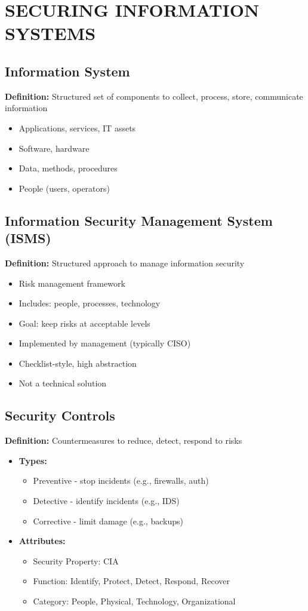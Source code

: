 \section{SECURING INFORMATION SYSTEMS}

\subsection{Information System}
{
\textbf{Definition:} Structured set of components to collect, process, store, communicate information
\begin{itemize}[noitemsep]
  \item Applications, services, IT assets
  \item Software, hardware
  \item Data, methods, procedures
  \item People (users, operators)
\end{itemize}
}
\subsection{Information Security Management System (ISMS)}
{
\textbf{Definition:} Structured approach to manage information security
\begin{itemize}[noitemsep]
  \item Risk management framework
  \item Includes: people, processes, technology
  \item Goal: keep risks at acceptable levels
  \item Implemented by management (typically CISO)
  \item Checklist-style, high abstraction
  \item Not a technical solution
\end{itemize}
}
\subsection{Security Controls}
{
\textbf{Definition:} Countermeasures to reduce, detect, respond to risks
\begin{itemize}[noitemsep]
  \item \textbf{Types:}
    \begin{itemize}[noitemsep]
      \item Preventive - stop incidents (e.g., firewalls, auth)
      \item Detective - identify incidents (e.g., IDS)
      \item Corrective - limit damage (e.g., backups)
    \end{itemize}
  \item \textbf{Attributes:}
    \begin{itemize}[noitemsep]
      \item Security Property: CIA
      \item Function: Identify, Protect, Detect, Respond, Recover
      \item Category: People, Physical, Technology, Organizational
    \end{itemize}
\end{itemize}
}
